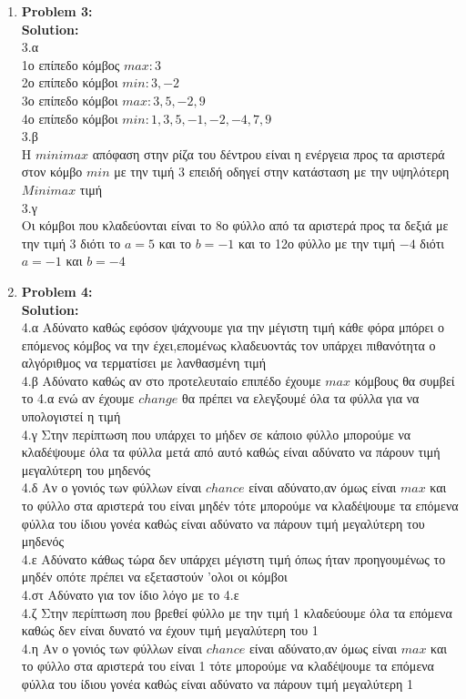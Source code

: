 \documentclass{article}
\begin{document}
\begin{enumerate}
    
    \item \textbf{Problem 3:} \\
    \textbf{Solution:}  \\
    3.α \\1ο επίπεδο κόμβος $max: 3$ \\
    2ο επίπεδο κόμβοι $min: 3 , -2$ \\
    3ο επίπεδο κόμβοι $ max: 3,5,-2,9$\\
    4ο επίπεδο κόμβοι $ min: 1,3,5,-1,-2,-4,7,9$\\
    3.β\\
    Η $minimax$ απόφαση στην ρίζα του δέντρου είναι η ενέργεια προς τα αριστερά στον κόμβο $min$ με την τιμή 3 επειδή οδηγεί στην κατάσταση με την υψηλότερη $Minimax$ τιμή \\
    3.γ\\
    Οι κόμβοι που κλαδεύονται είναι το 8ο φύλλο από τα αριστερά προς τα δεξιά με την τιμή 3 διότι το $a = 5$ και το $b=-1$ και το 12ο φύλλο με την τιμή $-4$ διότι $a=-1$ και $b = -4$
   

    
    
    \item \textbf{Problem 4:}\\ 
    \textbf{Solution:}  \\
    4.α Αδύνατο καθώς εφόσον ψάχνουμε για την μέγιστη τιμή κάθε φόρα μπόρει ο επόμενος κόμβος να την έχει,επομένως κλαδευοντάς τον υπάρχει πιθανότητα ο αλγόριθμος να τερματίσει με λανθασμένη τιμή\\ 
    4.β Αδύνατο καθώς αν στο προτελευταίο επιπέδο έχουμε $max$ κόμβους θα συμβεί το 4.α ενώ αν έχουμε $change$ θα πρέπει να ελεγξουμέ όλα τα φύλλα για να υπολογιστεί η τιμή\\
    4.γ Στην περίπτωση που υπάρχει το μήδεν σε κάποιο φύλλο μπορούμε να κλαδέψουμε όλα τα φύλλα μετά από αυτό καθώς είναι αδύνατο να πάρουν τιμή μεγαλύτερη του μηδενός\\
    4.δ Αν ο γονιός των φύλλων είναι $chance$ είναι αδύνατο,αν όμως είναι $max$ και το φύλλο στα αριστερά του είναι μηδέν τότε μπορούμε να κλαδέψουμε τα επόμενα φύλλα του ίδιου γονέα καθώς είναι αδύνατο να πάρουν τιμή μεγαλύτερη του μηδενός\\
    4.ε Αδύνατο κάθως τώρα δεν υπάρχει μέγιστη τιμή όπως ήταν προηγουμένως το μηδέν οπότε πρέπει να εξεταστούν 'ολοι οι κόμβοι\\
    4.στ Αδύνατο για τον ίδιο λόγο με το 4.ε\\
    4.ζ Στην περίπτωση που βρεθεί φύλλο με την τιμή 1 κλαδεύουμε όλα τα επόμενα καθώς δεν είναι δυνατό να έχουν τιμή μεγαλύτερη του 1\\
    4.η Αν ο γονιός των φύλλων είναι $chance$ είναι αδύνατο,αν όμως είναι $max$ και το φύλλο στα αριστερά του είναι 1 τότε μπορούμε να κλαδέψουμε τα επόμενα φύλλα του ίδιου γονέα καθώς είναι αδύνατο να πάρουν τιμή μεγαλύτερη 1\\
    
    
\end{enumerate}
\end{document}
